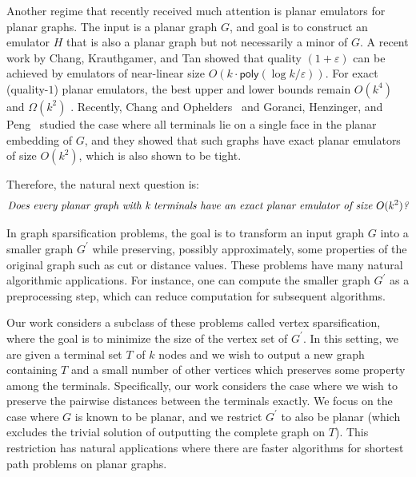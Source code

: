 \documentclass[11pt]{article}
\newcommand{\poly}{\mathsf{poly}}
\newcommand{\eps}{\varepsilon}
\begin{document}
Another regime that recently received much attention is planar emulators for planar graphs. The input is a planar graph $G$, and goal is to construct an emulator $H$ that is also a planar graph but not necessarily a minor of $G$.
A recent work by Chang, Krauthgamer, and Tan \cite{chang2022almost} showed that quality $(1+\eps)$ can be achieved by emulators of near-linear size $O(k\cdot\poly(\log k/\eps))$. For exact (quality-$1$) planar emulators, the best upper and lower bounds remain $O(k^4)$ and $\Omega(k^2)$ \cite{krauthgamer2014preserving}.
Recently, Chang and Ophelders~\cite{ChangO20} and Goranci, Henzinger, and Peng~\cite{goranci2020improved} studied the case where all terminals lie on a single face in the planar embedding of $G$, and they showed that such graphs have exact planar emulators of size $O(k^2)$, which is also shown to be tight.

Therefore, the natural next question is:
\[\emph{Does every planar graph with k terminals have an exact planar emulator of size $O(k^2)$?}
\]
















\iffalse
In graph sparsification problems, the goal is to transform an input graph $G$ into a smaller graph $G^\prime$ while preserving, possibly approximately, some properties of the original graph such as cut or distance values. These problems have many natural algorithmic applications. For instance, one can compute the smaller graph $G^\prime$ as a preprocessing step, which can reduce computation for subsequent algorithms. 

Our work considers a subclass of these problems called vertex sparsification, where the goal is to minimize the size of the vertex set of $G^\prime$. In this setting, we are given a terminal set $T$ of $k$ nodes and we wish to output a new graph containing $T$ and a small number of other vertices which preserves some property among the terminals. Specifically, our work considers the case where we wish to preserve the pairwise distances between the terminals exactly. We focus on the case where $G$ is known to be planar, and we restrict $G^\prime$ to also be planar (which excludes the trivial solution of outputting the complete graph on $T$). This restriction has natural applications where there are faster algorithms for shortest path problems on planar graphs. 
\end{document}
